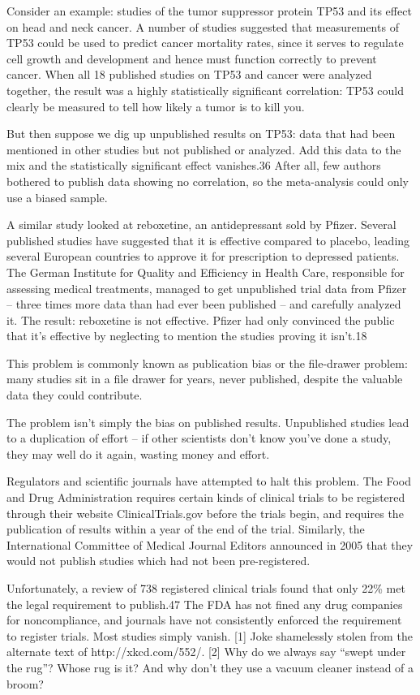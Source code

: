 Consider an example: studies of the tumor suppressor protein TP53 and its effect on head and neck cancer. A number of studies suggested that measurements of TP53 could be used to predict cancer mortality rates, since it serves to regulate cell growth and development and hence must function correctly to prevent cancer. When all 18 published studies on TP53 and cancer were analyzed together, the result was a highly statistically significant correlation: TP53 could clearly be measured to tell how likely a tumor is to kill you.

But then suppose we dig up unpublished results on TP53: data that had been mentioned in other studies but not published or analyzed. Add this data to the mix and the statistically significant effect vanishes.36 After all, few authors bothered to publish data showing no correlation, so the meta-analysis could only use a biased sample.

A similar study looked at reboxetine, an antidepressant sold by Pfizer. Several published studies have suggested that it is effective compared to placebo, leading several European countries to approve it for prescription to depressed patients. The German Institute for Quality and Efficiency in Health Care, responsible for assessing medical treatments, managed to get unpublished trial data from Pfizer – three times more data than had ever been published – and carefully analyzed it. The result: reboxetine is not effective. Pfizer had only convinced the public that it’s effective by neglecting to mention the studies proving it isn’t.18

This problem is commonly known as publication bias or the file-drawer problem: many studies sit in a file drawer for years, never published, despite the valuable data they could contribute.

The problem isn’t simply the bias on published results. Unpublished studies lead to a duplication of effort – if other scientists don’t know you’ve done a study, they may well do it again, wasting money and effort.

Regulators and scientific journals have attempted to halt this problem. The Food and Drug Administration requires certain kinds of clinical trials to be registered through their website ClinicalTrials.gov before the trials begin, and requires the publication of results within a year of the end of the trial. Similarly, the International Committee of Medical Journal Editors announced in 2005 that they would not publish studies which had not been pre-registered.

Unfortunately, a review of 738 registered clinical trials found that only 22\% met the legal requirement to publish.47 The FDA has not fined any drug companies for noncompliance, and journals have not consistently enforced the requirement to register trials. Most studies simply vanish.
[1]	Joke shamelessly stolen from the alternate text of http://xkcd.com/552/.
[2]	Why do we always say “swept under the rug”? Whose rug is it? And why don’t they use a vacuum cleaner instead of a broom?